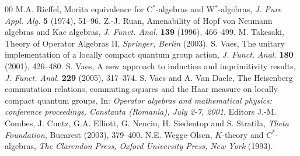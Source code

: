 \documentclass[reqno]{amsart}
\numberwithin{equation}{section}
\begin{document}
\begin{thebibliography}{00}
 M.A. Rieffel, Morita equivalence for C$^*$-algebras and W$^*$-algebras, \emph{J. Pure Appl. Alg.} \textbf{5} (1974), 51--96.
 Z.-J. Ruan, Amenability of Hopf von Neumann algebras and Kac algebras, \emph{J. Funct. Anal.} \textbf{139} (1996), 466--499.
 M. Takesaki, Theory of Operator Algebras II, \emph{Springer, Berlin} (2003).
 S. Vaes, The unitary implementation of a locally compact quantum group action, \emph{J. Funct. Anal.} \textbf{180} (2001), 426--480.
 S. Vaes, A new approach to induction and imprimitivity results, \emph{J. Funct. Anal.} \textbf{229} (2005), 317--374.
 S. Vaes and A. Van Daele, The Heisenberg commutation relations, commuting squares and the Haar measure on locally compact quantum groups, In: \emph{Operator algebras and mathematical physics: conference proceedings, Constanta (Romania), July 2-7, 2001}, Editors J.-M. Combes, J. Cuntz, G.A. Elliott, G. Nenciu, H. Siedentop and S. Stratila, \emph{Theta Foundation}, Bucarest (2003), 379--400.
 N.E. Wegge-Olsen, {$K$}-theory and {$C^*$}-algebras, \emph{The Clarendon Press, Oxford University Press, New York} (1993).
\end{thebibliography}
\end{document}
